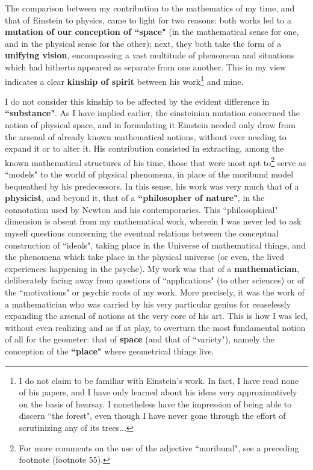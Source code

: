 The comparison between my contribution to the mathematics of my time, and that of Einstein to physics, came to light for two reasons: both works led to a \textbf{mutation of our conception of ``space"} (in the mathematical sense for one, and in the physical sense for the other); next, they both take the form of a \textbf{unifying vision}, encompassing a vast multitude of phenomena and situations which had hitherto appeared as separate from one another. This in my view indicates a clear \textbf{kinship of spirit} between his work\footnote{I do not claim to be familiar with Einstein's work. In fact, I have read none of his papers, and I have only learned about his ideas very approximatively on the basis of hearsay. I nonetheless have the impression of being able to discern ``the forest", even though I have never gone through the effort of scrutinizing any of its trees...} and mine. 

I do not consider this kinship to be affected by the evident difference in \textbf{``substance"}. As I have implied earlier, the einsteinian mutation concerned the notion of physical space, and in formulating it Einstein needed only draw from the arsenal of already known mathematical notions, without ever needing to expand it or to alter it. His contribution consisted in extracting, among the known mathematical structures of his time, those that were most apt to\footnote{For more comments on the use of the adjective ``moribund", see a preceding footnote (footnote 55).} serve as ``models" to the world of physical phenomena, in place of the moribund model bequeathed by his predecessors. In this sense, his work was very much that of a \textbf{physicist}, and beyond it, that of a \textbf{``philosopher of nature"}, in the connotation used by Newton and his contemporaries. This ``philosophical" dimension is absent from my mathematical work, wherein I was never led to ask myself questions concerning the eventual relations between the conceptual construction of ``ideals", taking place in the Universe of mathematical things, and the phenomena which take place in the physical universe (or even, the lived experiences happening in the psyche). My work was that of a \textbf{mathematician}, deliberately facing away from questions of ``applications" (to other sciences) or of the ``motivations" or psychic roots of my work. More precisely, it was the work of a mathematician who was carried by his very particular genius for ceaselessly expanding the arsenal of notions at the very core of his art. This is how I was led, without even realizing and as if at play, to overturn the most fundamental notion of all for the geometer: that of \textbf{space} (and that of ``variety"), namely the conception of the \textbf{``place"} where geometrical things live. 


